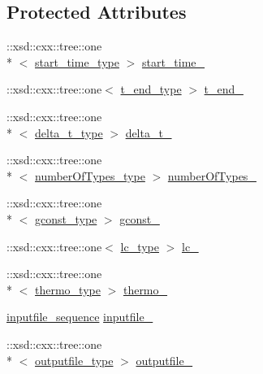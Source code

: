 \subsection*{Protected Attributes}
\begin{DoxyCompactItemize}
\item 
\-::xsd\-::cxx\-::tree\-::one\\*
$<$ \hyperlink{classpse__t_a2b49c9d348499d75809e2b655582eb6f}{start\-\_\-time\-\_\-type} $>$ \hyperlink{classpse__t_a3c0371b1f824a3c8b16d1b076afd456c}{start\-\_\-time\-\_\-}
\item 
\-::xsd\-::cxx\-::tree\-::one$<$ \hyperlink{classpse__t_ac4239e9fa324e53f5964848e3089fef6}{t\-\_\-end\-\_\-type} $>$ \hyperlink{classpse__t_a751791f6389581ad98c18e14ec318325}{t\-\_\-end\-\_\-}
\item 
\-::xsd\-::cxx\-::tree\-::one\\*
$<$ \hyperlink{classpse__t_a7af94a081ff80545fa4d069c4ba56b57}{delta\-\_\-t\-\_\-type} $>$ \hyperlink{classpse__t_ab25fd51647edb6fe1f7cb87489d9fa66}{delta\-\_\-t\-\_\-}
\item 
\-::xsd\-::cxx\-::tree\-::one\\*
$<$ \hyperlink{classpse__t_a3aa6a8cc1b9642304371fb935f6e1965}{number\-Of\-Types\-\_\-type} $>$ \hyperlink{classpse__t_add66389e6101c9db5136551a05426f1f}{number\-Of\-Types\-\_\-}
\item 
\-::xsd\-::cxx\-::tree\-::one\\*
$<$ \hyperlink{classpse__t_a86b52d56dfb0c43a023d8bda8b4a19ed}{gconst\-\_\-type} $>$ \hyperlink{classpse__t_ace4fd13345230aae4ebce2010215fa43}{gconst\-\_\-}
\item 
\-::xsd\-::cxx\-::tree\-::one$<$ \hyperlink{classpse__t_aa6a9bda12a405c1b9fb0baecbed9a1bb}{lc\-\_\-type} $>$ \hyperlink{classpse__t_a9fd16cb0ce41afb6a52d300c67ab0d44}{lc\-\_\-}
\item 
\-::xsd\-::cxx\-::tree\-::one\\*
$<$ \hyperlink{classpse__t_aebaae32f697fb451e7bab83078867d4e}{thermo\-\_\-type} $>$ \hyperlink{classpse__t_aae4e2724ad2d21705a74891b90e6446c}{thermo\-\_\-}
\item 
\hyperlink{classpse__t_a4256607256aa600165964a3a6d7b4a00}{inputfile\-\_\-sequence} \hyperlink{classpse__t_a7c156cd2ed2e3501fe3f7f1e40116c60}{inputfile\-\_\-}
\item 
\-::xsd\-::cxx\-::tree\-::one\\*
$<$ \hyperlink{classpse__t_ae86d42dbfdd42a4d53733b6b11b5f875}{outputfile\-\_\-type} $>$ \hyperlink{classpse__t_a81e5b212ed8936e46720248274c67d9f}{outputfile\-\_\-}
\end{DoxyCompactItemize}


